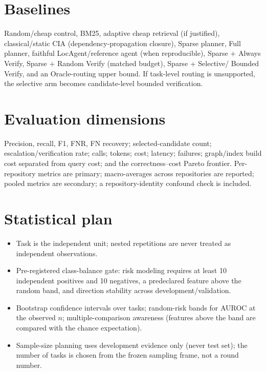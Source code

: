 \documentclass[11pt,a4paper]{article}
\begin{document}
\section{Baselines}
\label{sec:baselines}

Random/cheap control, BM25, adaptive cheap retrieval (if justified),
classical/static CIA (dependency-propagation closure), Sparse planner, Full
planner, faithful LocAgent/reference agent (when reproducible), Sparse +
Always Verify, Sparse + Random Verify (matched budget), Sparse + Selective/
Bounded Verify, and an Oracle-routing upper bound. If task-level routing is
unsupported, the selective arm becomes candidate-level bounded verification.

\section{Evaluation dimensions}
\label{sec:eval}

Precision, recall, F1, FNR, FN recovery; selected-candidate count;
escalation/verification rate; calls; tokens; cost; latency; failures;
graph/index build cost separated from query cost; and the correctness--cost
Pareto frontier. Per-repository metrics are primary; macro-averages across
repositories are reported; pooled metrics are secondary; a repository-identity
confound check is included.

\section{Statistical plan}
\label{sec:stats}

\begin{itemize}
  \item Task is the independent unit; nested repetitions are never treated as
        independent observations.
  \item Pre-registered class-balance gate: risk modeling requires at least 10
        independent positives and 10 negatives, a predeclared feature above the
        random band, and direction stability across development/validation.
  \item Bootstrap confidence intervals over tasks; random-risk bands for
        AUROC at the observed $n$; multiple-comparison awareness (features
        above the band are compared with the chance expectation).
  \item Sample-size planning uses development evidence only (never test set);
        the number of tasks is chosen from the frozen sampling frame, not a
        round number.
\end{itemize}
\end{document}
